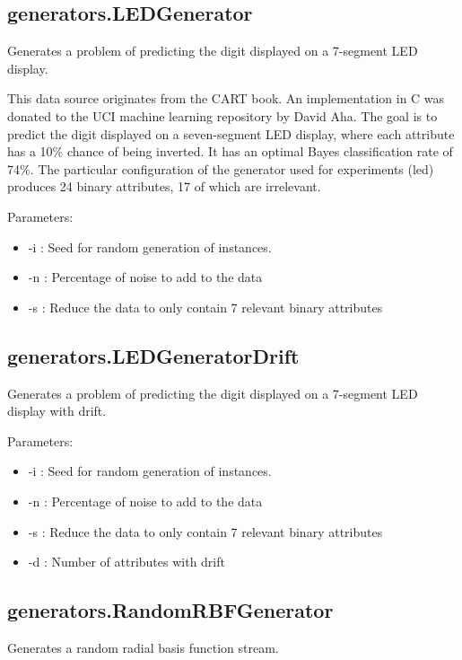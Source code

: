 \documentclass[a4paper,12pt,twoside]{book}
\begin{document}
\subsection{generators.LEDGenerator} Generates a problem of predicting the digit displayed on a 7-segment LED display.

This data source originates from the CART book. An implementation in
C was donated to the UCI machine learning repository by David Aha. The
goal is to predict the digit displayed on a seven-segment LED display, where
each attribute has a 10\% chance of being inverted. It has an optimal Bayes
classification rate of 74\%. The particular configuration of the generator used
for experiments (led) produces 24 binary attributes, 17 of which are irrelevant.


Parameters:

\begin{itemize}
\item -i : Seed for random generation of instances.
\item -n : Percentage of noise to add to the data
\item -s : Reduce the data to only contain 7 relevant binary attributes\end{itemize}


\subsection{generators.LEDGeneratorDrift} Generates a problem of predicting the digit displayed on a 7-segment LED display with drift.

Parameters:

\begin{itemize}
\item -i : Seed for random generation of instances.
\item -n : Percentage of noise to add to the data
\item -s : Reduce the data to only contain 7 relevant binary attributes
\item -d : Number of attributes with drift\end{itemize}



\subsection{generators.RandomRBFGenerator} Generates a random radial basis function stream.
\end{document}
